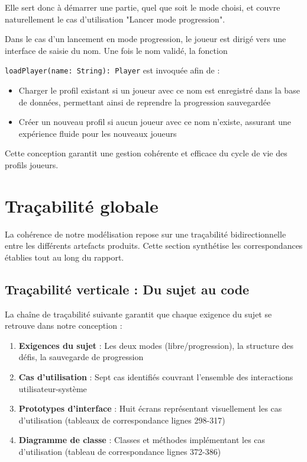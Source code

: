 \documentclass{butexFR}
\begin{document}
Elle sert donc à démarrer une partie, quel que soit le mode choisi, et couvre naturellement le cas d'utilisation "Lancer mode progression".

Dans le cas d'un lancement en mode progression, le joueur est dirigé vers une interface de saisie du nom. Une fois le nom validé, la fonction

\texttt{loadPlayer(name: String): Player} est invoquée afin de :
\begin{itemize}
\item Charger le profil existant si un joueur avec ce nom est enregistré dans la base de données, permettant ainsi de reprendre la progression sauvegardée
\item Créer un nouveau profil si aucun joueur avec ce nom n'existe, assurant une expérience fluide pour les nouveaux joueurs
\end{itemize}

Cette conception garantit une gestion cohérente et efficace du cycle de vie des profils joueurs.

\section{Traçabilité globale}

La cohérence de notre modélisation repose sur une traçabilité bidirectionnelle entre les différents artefacts produits. Cette section synthétise les correspondances établies tout au long du rapport.

\subsection{Traçabilité verticale : Du sujet au code}

La chaîne de traçabilité suivante garantit que chaque exigence du sujet se retrouve dans notre conception :

\begin{enumerate}
    \item \textbf{Exigences du sujet} : Les deux modes (libre/progression), la structure des défis, la sauvegarde de progression
    \item \textbf{Cas d'utilisation} : Sept cas identifiés couvrant l'ensemble des interactions utilisateur-système
    \item \textbf{Prototypes d'interface} : Huit écrans représentant visuellement les cas d'utilisation (tableaux de correspondance lignes 298-317)
    \item \textbf{Diagramme de classe} : Classes et méthodes implémentant les cas d'utilisation (tableau de correspondance lignes 372-386)
\end{enumerate}
\end{document}
